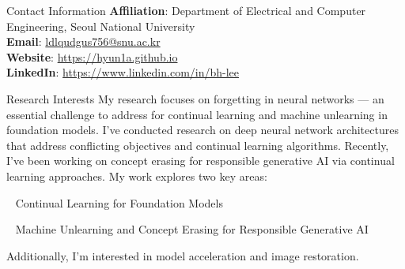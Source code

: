 \documentclass{resume} %
\begin{document}
\begin{rSection}{Contact Information}
{\bf Affiliation}: Department of Electrical and Computer Engineering, Seoul National University \\
{\bf Email}: \href{mailto:ldlqudgus756@snu.ac.kr}{ldlqudgus756@snu.ac.kr} \\
{\bf Website}: \href{https://hyun1a.github.io}{https://hyun1a.github.io} \\
{\bf LinkedIn}: \href{https://www.linkedin.com/in/bh-lee}{https://www.linkedin.com/in/bh-lee} \\
\end{rSection}


\begin{rSection}{Research Interests}
My research focuses on forgetting in neural networks — an essential challenge to address for continual learning and machine unlearning in foundation models. I've conducted research on deep neural network architectures that address conflicting objectives and continual learning algorithms. Recently, I've been working on concept erasing for responsible generative AI via continual learning approaches. My work explores two key areas:

\textbullet~\,\,Continual Learning for Foundation Models

\textbullet~\,\,Machine Unlearning and Concept Erasing for Responsible Generative AI


Additionally, I’m interested in model acceleration and image restoration. \\
\end{rSection}
\end{document}
